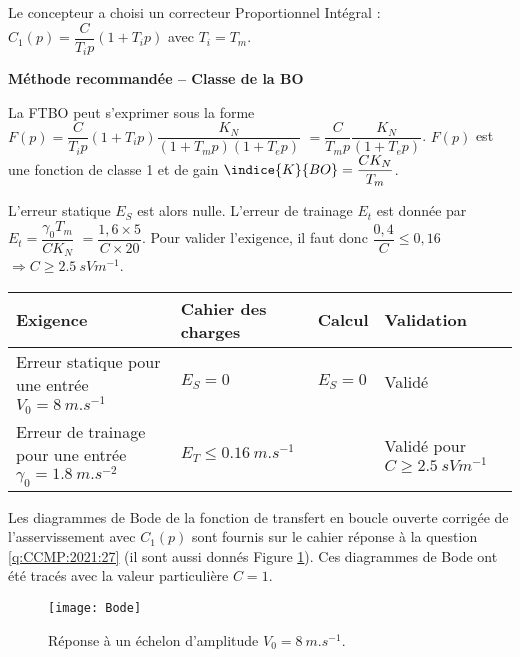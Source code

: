 Le concepteur a choisi un correcteur Proportionnel Intégral :	$C_1 (p)=\dfrac{C}{T_i p} \left(1+T_i p\right)$ avec $T_i=T_m$.

\ifprof
\begin{corrige}
\textbf{Méthode recommandée -- Classe de la BO}

La FTBO peut s'exprimer sous la forme $F(p)=\dfrac{C}{T_i p} \left(1+T_i p\right)\dfrac{K_N}{\left(1+T_m p\right) \left(1+T_e p\right)}$ $=\dfrac{C}{T_m p}\dfrac{K_N}{ \left(1+T_e p\right)}$. $F(p)$ est une fonction de classe 1 et de gain $\indice{K}{BO} = \dfrac{CK_N}{T_m} $.

L'erreur statique $E_S$ est alors nulle. L'erreur de trainage $E_t$ est donnée par  $E_t = \dfrac{\gamma_0 T_m}{C K_N}$ $ =\dfrac{1,6\times 5}{C \times 20}$. Pour valider l'exigence, il faut donc $\dfrac{0,4}{C} \leq 0,16 $
$\Rightarrow C\geq  \SI{2,5}{sVm^{-1}}$.

\begin{center}
\begin{tabular}{p{5cm}llp{3cm}}
\hline
Exigence & Cahier des charges & Calcul & Validation  \\
\hline
Erreur statique pour une entrée $V_0 = \SI{8}{m.s^{-1}}$ & $E_S=0$ & $E_S=0$ & Validé \\
Erreur de trainage pour une entrée $\gamma_0 = \SI{1,8}{m.s^{-2}}$ & $E_T\leq \SI{0,16}{m.s^{-1}}$ &  & Validé pour  $C\geq  \SI{2,5}{sVm^{-1}}$\\
\hline
\end{tabular}
\end{center} 
\end{corrige}
\else
\fi

Les diagrammes de Bode de la fonction de transfert en boucle ouverte corrigée de l'asservissement avec $C_1 (p)$ sont fournis sur le cahier réponse à la question \ref{q:CCMP:2021:27} (il sont aussi donnés Figure \ref{fig:CCMP:2021:bode}). Ces diagrammes de Bode ont été tracés avec la valeur particulière $C=1$.


\begin{figure}[!h]
\centering
\texttt{[image: Bode]}
\caption{\label{fig:CCMP:2021:bode} Réponse à un échelon d’amplitude $V_0=\SI{8}{m.s^{-1}}$.}
\end{figure} 

